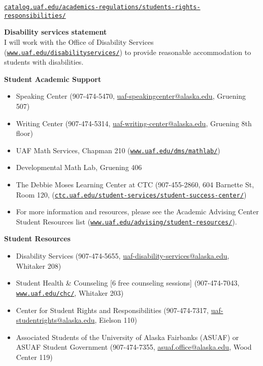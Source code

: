\documentclass[12pt]{article}
\renewcommand{\emph}[1]{\textsf{\textbf{#1}}}
\def\mailto#1{\href{mailto:#1}{#1}}
\newcommand{\localhead}[1]{\par\smallskip\textbf{#1} \smallskip\nobreak\\}%
\def\subheading#1{\localhead{\emph{#1}}}
\begin{document}
\href{https://catalog.uaf.edu/academics-regulations/students-rights-responsibilities/}{\texttt{catalog.uaf.edu/academics-regulations/students-rights-responsibilities/}}

\subheading{Disability services statement}
I will work with the Office of Disability Services (\href{https://www.uaf.edu/disabilityservices/}{\texttt{www.uaf.edu/disabilityservices/}}) to provide reasonable accommodation to students with disabilities.

\subheading{Student Academic Support}

\vspace{-7mm}
\begin{itemize}
\item Speaking Center (907-474-5470, \mailto{uaf-speakingcenter@alaska.edu}, Gruening 507)
\item Writing Center (907-474-5314, \mailto{uaf-writing-center@alaska.edu}, Gruening 8th floor)
\item UAF Math Services, Chapman 210 (\href{http://www.uaf.edu/dms/mathlab/}{\texttt{www.uaf.edu/dms/mathlab/}})
\item Developmental Math Lab, Gruening 406
\item The Debbie Moses Learning Center at CTC (907-455-2860, 604 Barnette St, Room 120, (\href{https://www.ctc.uaf.edu/student-services/student-success-center/}{\texttt{ctc.uaf.edu/student-services/student-success-center/}})
\item For more information and resources, please see the Academic Advising Center Student Resources list (\href{https://www.uaf.edu/advising/student-resources/}{\texttt{www.uaf.edu/advising/student-resources/}}).
\end{itemize}

\subheading{Student Resources}

\vspace{-7mm}
\begin{itemize}
\item Disability Services (907-474-5655, \mailto{uaf-disability-services@alaska.edu}, Whitaker 208)
\item Student Health \& Counseling [6 free counseling sessions] (907-474-7043, \href{https://www.uaf.edu/chc/}{\texttt{www.uaf.edu/chc/}}, Whitaker 203)
\item Center for Student Rights and Responsibilities (907-474-7317, \mailto{uaf-studentrights@alaska.edu}, Eielson 110)
\item Associated Students of the University of Alaska Fairbanks (ASUAF) or ASUAF Student Government (907-474-7355, \mailto{asuaf.office@alaska.edu}, Wood Center 119)
\end{itemize}
\end{document}
